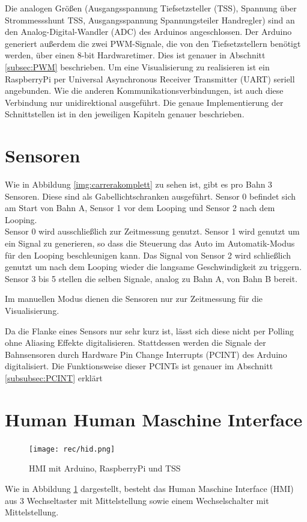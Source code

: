 \documentclass[a4paper, 11pt]{report}
\begin{document}
	Die analogen Größen (Ausgangsspannung Tiefsetzsteller (TSS), Spannung über Strommessshunt TSS, Ausgangsspannung Spannungsteiler Handregler) sind an den Analog-Digital-Wandler (ADC) des Arduinos angeschlossen.
	Der Arduino generiert außerdem die zwei PWM-Signale, die von den Tiefsetzstellern benötigt werden, über einen 8-bit Hardwaretimer.
	Dies ist genauer in Abschnitt \ref{subsec:PWM} beschrieben.
	Um eine Visualisierung zu realisieren ist ein RaspberryPi per Universal Asynchronous Receiver Transmitter (UART) seriell angebunden. Wie die anderen Kommunikationsverbindungen, ist auch diese Verbindung nur unidirektional ausgeführt.
	Die genaue Implementierung der Schnittstellen ist in den jeweiligen Kapiteln genauer beschrieben.
	\section{Sensoren}
		Wie in Abbildung \ref{img:carrerakomplett} zu sehen ist, gibt es pro Bahn 3 Sensoren. Diese sind als Gabellichtschranken ausgeführt. Sensor 0 befindet sich am Start von Bahn A, Sensor 1 vor dem Looping und Sensor 2 nach dem Looping.\\


		Sensor 0 wird ausschließlich zur Zeitmessung genutzt.
		Sensor 1 wird genutzt um ein Signal zu generieren, so dass die Steuerung das Auto im Automatik-Modus für den Looping beschleunigen kann.
		Das Signal von Sensor 2 wird schließlich genutzt um nach dem Looping wieder die langsame Geschwindigkeit zu triggern.\\
		Sensor 3 bis 5 stellen die selben Signale, analog zu Bahn A, von Bahn B bereit.

		Im manuellen Modus dienen die Sensoren nur zur Zeitmessung für die Visualisierung.

		Da die Flanke eines Sensors nur sehr kurz ist, lässt sich diese nicht per Polling ohne Aliasing Effekte digitalisieren. Stattdessen werden die Signale der Bahnsensoren durch Hardware Pin Change Interrupts (PCINT) des Arduino digitalisiert.
		Die Funktionsweise dieser PCINTs ist genauer im Abschnitt \ref{subsubsec:PCINT} erklärt
	\section{Human Human Maschine Interface}
		\begin{figure}[ht]
			\centering
			\texttt{[image: rec/hid.png]}
			\caption{HMI mit Arduino, RaspberryPi und TSS}

			\label{img:hid}
		\end{figure}
		Wie in Abbildung \ref{img:hid} dargestellt, besteht das Human Maschine Interface (HMI) aus 3 Wechseltaster mit Mittelstellung sowie einem Wechselschalter mit Mittelstellung.
\end{document}

